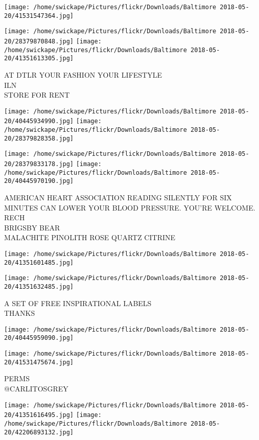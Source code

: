 \documentclass[10pt,letterpaper]{article}
\begin{document}
\texttt{[image: /home/swickape/Pictures/flickr/Downloads/Baltimore 2018-05-20/41531547364.jpg]}

\vspace{0.25in}
\texttt{[image: /home/swickape/Pictures/flickr/Downloads/Baltimore 2018-05-20/28379870848.jpg]}
\texttt{[image: /home/swickape/Pictures/flickr/Downloads/Baltimore 2018-05-20/41351613305.jpg]}

AT DTLR YOUR FASHION YOUR LIFESTYLE\\
ILN\\
STORE FOR RENT
\pagebreak

\texttt{[image: /home/swickape/Pictures/flickr/Downloads/Baltimore 2018-05-20/40445934990.jpg]}
\texttt{[image: /home/swickape/Pictures/flickr/Downloads/Baltimore 2018-05-20/28379828358.jpg]}

\texttt{[image: /home/swickape/Pictures/flickr/Downloads/Baltimore 2018-05-20/28379833178.jpg]}
\texttt{[image: /home/swickape/Pictures/flickr/Downloads/Baltimore 2018-05-20/40445970190.jpg]}

AMERICAN HEART ASSOCIATION READING SILENTLY FOR SIX MINUTES CAN LOWER YOUR BLOOD PRESSURE.  YOU'RE WELCOME.\\
RECH\\
BRIGSBY BEAR\\
MALACHITE PINOLITH ROSE QUARTZ CITRINE
\pagebreak

\texttt{[image: /home/swickape/Pictures/flickr/Downloads/Baltimore 2018-05-20/41351601485.jpg]}

\vspace{0.25in}
\texttt{[image: /home/swickape/Pictures/flickr/Downloads/Baltimore 2018-05-20/41351632485.jpg]}

A SET OF FREE INSPIRATIONAL LABELS\\
THANKS
\pagebreak

\texttt{[image: /home/swickape/Pictures/flickr/Downloads/Baltimore 2018-05-20/40445959090.jpg]}

\vspace{0.25in}
\texttt{[image: /home/swickape/Pictures/flickr/Downloads/Baltimore 2018-05-20/41531475674.jpg]}

PERMS\\
@CARLITOSGREY
\pagebreak

\texttt{[image: /home/swickape/Pictures/flickr/Downloads/Baltimore 2018-05-20/41351616495.jpg]}
\texttt{[image: /home/swickape/Pictures/flickr/Downloads/Baltimore 2018-05-20/42206893132.jpg]}
\end{document}
